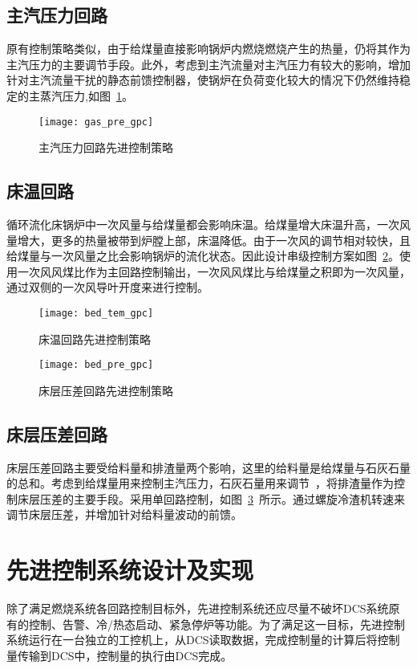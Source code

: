 \subsection{主汽压力回路}
原有控制策略类似，由于给煤量直接影响锅炉内燃烧燃烧产生的热量，仍将其作为主汽压力的主要调节手段。此外，考虑到主汽流量对主汽压力有较大的影响，增加针对主汽流量干扰的静态前馈控制器，使锅炉在负荷变化较大的情况下仍然维持稳定的主蒸汽压力,如图~\ref{fig:gas_pre_gpc}。
\begin{figure}[hbtp]
\centering
\texttt{[image: gas\_pre\_gpc]}
\caption{主汽压力回路先进控制策略} \label{fig:gas_pre_gpc}
\end{figure}
\subsection{床温回路}
循环流化床锅炉中一次风量与给煤量都会影响床温。给煤量增大床温升高，一次风量增大，更多的热量被带到炉膛上部，床温降低。由于一次风的调节相对较快，且给煤量与一次风量之比会影响锅炉的流化状态。因此设计串级控制方案如图~\ref{fig:bed_tem_gpc}。使用一次风风煤比作为主回路控制输出，一次风风煤比与给煤量之积即为一次风量，通过双侧的一次风导叶开度来进行控制。
\begin{figure}[!hbt]
\centering
\texttt{[image: bed\_tem\_gpc]}
\caption{床温回路先进控制策略} \label{fig:bed_tem_gpc}
\end{figure}
\begin{figure}[!hbt]
\centering
\texttt{[image: bed\_pre\_gpc]}
\caption{床层压差回路先进控制策略} \label{fig:bed_pre_gpc}
\end{figure}
\subsection{床层压差回路}
床层压差回路主要受给料量和排渣量两个影响，这里的给料量是给煤量与石灰石量的总和。考虑到给煤量用来控制主汽压力，石灰石量用来调节~，将排渣量作为控制床层压差的主要手段。采用单回路控制，如图~\ref{fig:bed_pre_gpc}~所示。通过螺旋冷渣机转速来调节床层压差，并增加针对给料量波动的前馈。




\section{先进控制系统设计及实现}
除了满足燃烧系统各回路控制目标外，先进控制系统还应尽量不破坏DCS系统原有的控制、告警、冷/热态启动、紧急停炉等功能。为了满足这一目标，先进控制系统运行在一台独立的工控机上，从DCS读取数据，完成控制量的计算后将控制量传输到DCS中，控制量的执行由DCS完成。
